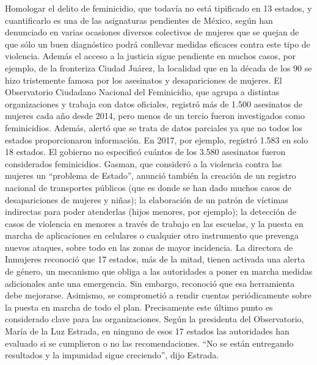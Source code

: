 \documentclass{article}%
\begin{document}
\newline%
%
Homologar el delito de feminicidio, que todavía no está tipificado en 13 estados, y cuantificarlo es una de las asignaturas pendientes de México, según han denunciado en varias ocasiones diversos colectivos de mujeres que se quejan de que sólo un buen diagnóstico podrá conllevar medidas eficaces contra este tipo de violencia.%
\newline%
%
Además el acceso a la justicia sigue pendiente en muchos casos, por ejemplo, de la fronteriza Ciudad Juárez, la localidad que en la década de los 90 se hizo tristemente famosa por los asesinatos y desapariciones de mujeres.%
\newline%
%
El Observatorio Ciudadano Nacional del Feminicidio, que agrupa a distintas organizaciones y trabaja con datos oficiales, registró más de 1.500 asesinatos de mujeres cada año desde 2014, pero menos de un tercio fueron investigados como feminicidios. Además, alertó que se trata de datos parciales ya que no todos los estados proporcionaron información. En 2017, por ejemplo, registró 1.583 en solo 18 estados.%
\newline%
%
El gobierno no especificó cuántos de los 3.580 asesinatos fueron considerados feminicidios.%
\newline%
%
Gasman, que consideró a la violencia contra las mujeres un “problema de Estado”, anunció también la creación de un registro nacional de transportes públicos (que es donde se han dado muchos casos de desapariciones de mujeres y niñas); la elaboración de un patrón de víctimas indirectas para poder atenderlas (hijos menores, por ejemplo); la detección de casos de violencia en menores a través de trabajo en las escuelas, y la puesta en marcha de aplicaciones en celulares o cualquier otro instrumento que prevenga nuevos ataques, sobre todo en las zonas de mayor incidencia.%
\newline%
%
La directora de Inmujeres reconoció que 17 estados, más de la mitad, tienen activada una alerta de género, un mecanismo que obliga a las autoridades a poner en marcha medidas adicionales ante una emergencia. Sin embargo, reconoció que esa herramienta debe mejorarse. Asimismo, se comprometió a rendir cuentas periódicamente sobre la puesta en marcha de todo el plan.%
\newline%
%
Precisamente este último punto es considerado clave para las organizaciones. Según la presidenta del Observatorio, María de la Luz Estrada, en ninguno de esos 17 estados las autoridades han evaluado si se cumplieron o no las recomendaciones. “No se están entregando resultados y la impunidad sigue creciendo”, dijo Estrada.%
\end{document}
